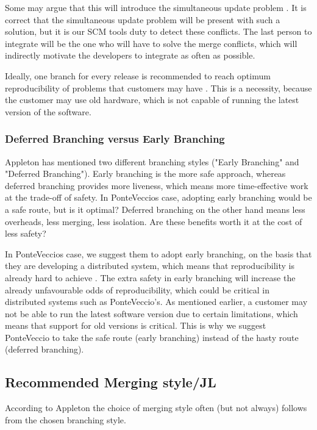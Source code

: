 \documentclass[10pt]{article}
\begin{document}
\noindent Some may argue that this will introduce the simultaneous update problem \cite{Babich}. It is correct that the simultaneous update problem will be present with such a solution, but it is our SCM tools duty to detect these conflicts. The last person to integrate will be the one who will have to solve the merge conflicts, which will indirectly motivate the developers to integrate as often as possible.

\noindent Ideally, one branch for every release is recommended to reach optimum reproducibility of problems that customers may have \cite{Vance}. This is a necessity, because the customer may use old hardware, which is not capable of running the latest version of the software.

\subsubsection{Deferred Branching versus Early Branching}
\noindent Appleton \cite{Appleton} has mentioned two different branching styles ("Early Branching" and "Deferred Branching"). Early branching is the more safe approach, whereas deferred branching provides more liveness\cite{Appleton}, which means more time-effective work at the trade-off of safety. In PonteVeccios case, adopting early branching would be a safe route, but is it optimal? Deferred branching on the other hand means less overheads, less merging, less isolation. Are these benefits worth it at the cost of less safety? 

\noindent In PonteVeccios case, we suggest them to adopt early branching, on the basis that they are developing a distributed system, which means that reproducibility is already hard to achieve \cite{Bays}. The extra safety in early branching will increase the already unfavourable odds of reproducibility, which could be critical in distributed systems such as PonteVeccio's. As mentioned earlier, a customer may not be able to run the latest software version due to certain limitations, which means that support for old versions is critical. This is why we suggest PonteVeccio to take the safe route (early branching) instead of the hasty route (deferred branching).

\subsection{Recommended Merging style/JL}
\noindent According to Appleton \cite{Appleton} the choice of merging style often (but not always) follows from the chosen branching style.
\end{document}
